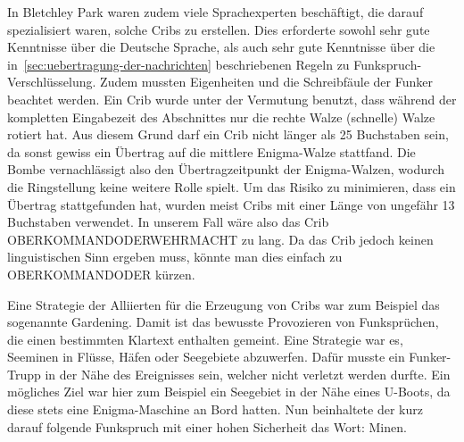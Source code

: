 In Bletchley Park waren zudem viele Sprachexperten beschäftigt, die darauf spezialisiert waren, solche Cribs zu erstellen.
Dies erforderte sowohl sehr gute Kenntnisse über die Deutsche Sprache, als auch sehr gute Kenntnisse über die in~\cref{sec:uebertragung-der-nachrichten}
beschriebenen Regeln zu Funkspruch-Verschlüsselung.
Zudem mussten Eigenheiten und die \glqq Schreibfäule\grqq{} der Funker beachtet werden.
Ein Crib wurde unter der Vermutung benutzt, dass während der kompletten Eingabezeit des Abschnittes nur die rechte Walze (schnelle) Walze rotiert hat.
Aus diesem Grund darf ein Crib nicht länger als 25 Buchstaben sein, da sonst gewiss ein Übertrag auf die mittlere Enigma-Walze stattfand.
Die Bombe vernachlässigt also den Übertragzeitpunkt der Enigma-Walzen, wodurch die Ringstellung keine weitere Rolle spielt.
Um das Risiko zu minimieren, dass ein Übertrag stattgefunden hat, wurden meist Cribs mit einer Länge von ungefähr 13 Buchstaben verwendet.
In unserem Fall wäre also das Crib \glqq OBERKOMMANDODERWEHRMACHT\grqq{} zu lang.
Da das Crib jedoch keinen linguistischen Sinn ergeben muss, könnte man dies einfach zu \glqq OBERKOMMANDODER\grqq{} kürzen.

Eine Strategie der Alliierten für die Erzeugung von Cribs war zum Beispiel das sogenannte \glqq Gardening\grqq.
Damit ist das bewusste Provozieren von Funksprüchen, die einen bestimmten Klartext enthalten gemeint.
Eine Strategie war es, Seeminen in Flüsse, Häfen oder Seegebiete abzuwerfen.
Dafür musste ein Funker-Trupp in der Nähe des Ereignisses sein, welcher nicht verletzt werden durfte.
Ein mögliches Ziel war hier zum Beispiel ein Seegebiet in der Nähe eines U-Boots, da diese stets eine Enigma-Maschine an Bord hatten.
Nun beinhaltete der kurz darauf folgende Funkspruch mit einer hohen Sicherheit das Wort: \glqq Minen\grqq.

\newpage
